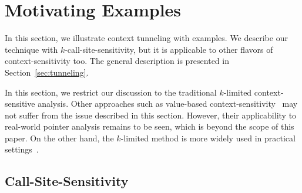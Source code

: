 
\section{Motivating Examples}
\label{sec:overview}

In this section, we illustrate context tunneling with examples.
We describe our technique with $k$-call-site-sensitivity, but it is applicable to other flavors of
context-sensitivity too. The general description
is presented in Section~\ref{sec:tunneling}.


In this section, we restrict our discussion to the
traditional $k$-limited context-sensitive analysis. %
Other approaches
such as value-based context-sensitivity~\cite{Khedker2008,PadhyeK13}
may not suffer from the issue described in this section.
However, their applicability to real-world pointer analysis remains to
be seen, which is beyond the scope of this paper. On the other hand,
the $k$-limited method is more widely used in practical settings~\cite{Bravenboer2009,Smaragdakis2011,KastrinisS13a,Smaragdakis2014,JeJeChOh17}.






\subsection{Call-Site-Sensitivity}

